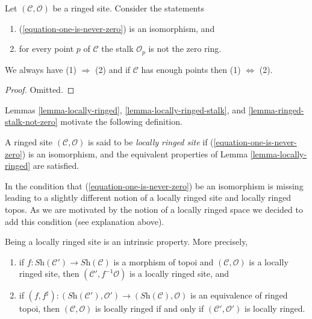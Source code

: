 \begin{lemma}
\label{lemma-ringed-stalk-not-zero}
Let $(\mathcal{C}, \mathcal{O})$ be a ringed site. Consider the statements
\begin{enumerate}
\item (\ref{equation-one-is-never-zero}) is an isomorphism, and
\item for every point $p$ of $\mathcal{C}$ the stalk $\mathcal{O}_p$
is not the zero ring.
\end{enumerate}
We always have (1) $\Rightarrow$ (2) and if $\mathcal{C}$ has enough points
then (1) $\Leftrightarrow$ (2).
\end{lemma}

\begin{proof}
Omitted.
\end{proof}

\noindent
Lemmas \ref{lemma-locally-ringed},
\ref{lemma-locally-ringed-stalk}, and
\ref{lemma-ringed-stalk-not-zero}
motivate the following definition.

\begin{definition}
\label{definition-locally-ringed}
A ringed site $(\mathcal{C}, \mathcal{O})$ is said to be
{\it locally ringed site} if (\ref{equation-one-is-never-zero})
is an isomorphism, and the equivalent properties of
Lemma \ref{lemma-locally-ringed}
are satisfied.
\end{definition}

\noindent
In \cite[Expos\'e IV, Exercice 13.9]{SGA4} the condition that
(\ref{equation-one-is-never-zero}) be an isomorphism is missing leading to
a slightly different notion of a locally ringed site and locally ringed
topos. As we are motivated by the notion of a locally ringed space we decided
to add this condition (see explanation above).

\begin{lemma}
\label{lemma-locally-ringed-intrinsic}
Being a locally ringed site is an intrinsic property.
More precisely,
\begin{enumerate}
\item if $f : \textit{Sh}(\mathcal{C}') \to \textit{Sh}(\mathcal{C})$
is a morphism of topoi and $(\mathcal{C}, \mathcal{O})$ is
a locally ringed site, then $(\mathcal{C}', f^{-1}\mathcal{O})$
is a locally ringed site, and
\item if
$(f, f^\sharp) : (\textit{Sh}(\mathcal{C}'), \mathcal{O}')
\to (\textit{Sh}(\mathcal{C}), \mathcal{O})$
is an equivalence of ringed topoi, then
$(\mathcal{C}, \mathcal{O})$ is locally ringed if and only if
$(\mathcal{C}', \mathcal{O}')$
is locally ringed.
\end{enumerate}
\end{lemma}

